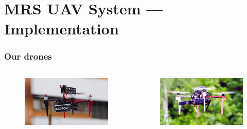 \documentclass[aspectratio=169]{beamer}
\begin{document}


\section{MRS UAV System --- Implementation}


\begin{frame}
  \frametitle{Our drones}

  \begin{columns}[c]


    \begin{figure}
      \centering
      \includegraphics[width=1.0\textwidth]{./fig/uavs/f330_real.jpg}
    \end{figure}

    \vspace{-1em}

    \begin{figure}
      \centering
      \includegraphics[width=1.0\textwidth]{./fig/uavs/f450_real.jpg}
    \end{figure}


\end{columns}
\end{frame}
\end{document}
